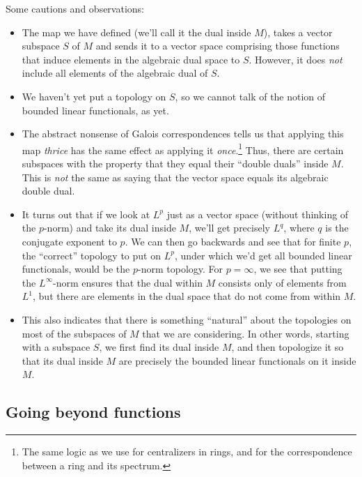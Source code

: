 \documentclass[a4paper]{amsart}
\begin{document}
Some cautions and observations:

\begin{itemize}

\item The map we have defined (we'll call it the dual inside $M$),
  takes a vector subspace $S$ of $M$ and sends it to a vector space
  comprising those functions that induce elements in the algebraic
  dual space to $S$. However, it does {\em not} include all elements
  of the algebraic dual of $S$.

\item We haven't yet put a topology on $S$, so we cannot talk of the
  notion of bounded linear functionals, as yet.

\item The abstract nonsense of Galois correspondences tells us that
  applying this map {\em thrice} has the same effect as applying it
  {\em once}.\footnote{The same logic as we use for centralizers in
    rings, and for the correspondence between a ring and its
    spectrum.} Thus, there are certain subspaces with the property
  that they equal their ``double duals'' inside $M$. This is {\em not}
  the same as saying that the vector space equals its algebraic double
  dual.

\item It turns out that if we look at $L^p$ just as a vector space
  (without thinking of the $p$-norm) and take its dual inside $M$,
  we'll get precisely $L^q$, where $q$ is the conjugate exponent to
  $p$. We can then go backwards and see that for finite $p$, the
  ``correct'' topology to put on $L^p$, under which we'd get all
  bounded linear functionals, would be the $p$-norm topology. For $p =
  \infty$, we see that putting the $L^\infty$-norm ensures that the
  dual within $M$ consists only of elements from $L^1$, but
  there are elements in the dual space that do not come from within
  $M$.

\item This also indicates that there is something ``natural'' about
  the topologies on most of the subspaces of $M$ that we are
  considering. In other words, starting with a subspace $S$, we first
  find its dual inside $M$, and then topologize it so that its dual
  inside $M$ are precisely the bounded linear functionals on it inside
  $M$.

\end{itemize}

\subsection{Going beyond functions}
\end{document}
